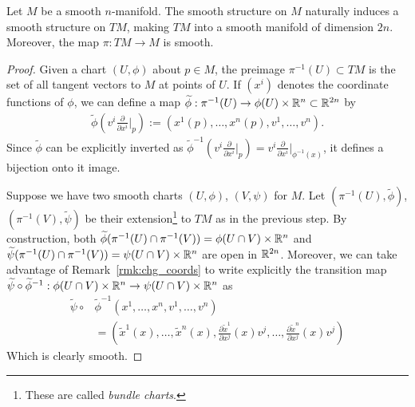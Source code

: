 \begin{theorem}\label{thm:tgbdlsmoothmfld}
  Let $M$ be a smooth $n$-manifold.
  The smooth structure on $M$ naturally induces a smooth structure on $TM$, making $TM$ into a smooth manifold of dimension $2n$.
  Moreover, the map $\pi: TM \to M$ is smooth.
\end{theorem}
\begin{proof}
  Given a chart $(U,\phi)$ about $p\in M$, the preimage $\pi^{-1}(U) \subset TM$ is the set of all tangent vectors to $M$ at points of $U$.
  If $(x^i)$ denotes the coordinate functions of $\phi$, we can define a map $\widetilde\phi : \pi^{-1}(U) \to \phi(U)\times\mathbb{R}^n \subset \mathbb{R}^{2n}$ by
  \begin{align}\label{eq:nat_coords}
    \widetilde\phi\left(v^i \frac{\partial}{\partial x^i}\Big|_p\right) := \left(x^1(p), \ldots, x^n(p), v^1, \ldots, v^n\right).
  \end{align}
  Since $\widetilde\phi$ can be explicitly inverted as $\widetilde\phi^{-1}\left(v^i \frac{\partial}{\partial x^i}\Big|_p\right) = v^i \frac{\partial}{\partial x^i}\Big|_{\phi^{-1}(x)}$, it defines a bijection onto it image.

  Suppose we have two smooth charts $(U,\phi)$, $(V,\psi)$ for $M$.
  Let $(\pi^{-1}(U),\widetilde\phi)$, $(\pi^{-1}(V),\widetilde\psi)$ be their extension\footnote{These are called \emph{bundle charts}.} to $TM$ as in the previous step.
  By construction, both $\widetilde\phi(\pi^{-1}(U)\cap\pi^{-1}(V)) = \phi(U\cap V)\times\mathbb{R}^n$ and $\widetilde\psi(\pi^{-1}(U)\cap\pi^{-1}(V)) = \psi(U\cap V)\times\mathbb{R}^n$ are open in $\mathbb{R}^{2n}$.
  Moreover, we can take advantage of Remark~\ref{rmk:chg_coords} to write explicitly the transition map  $\widetilde\psi\circ\widetilde\phi^{-1}: \phi(U\cap V)\times\mathbb{R}^n \to \psi(U\cap V)\times\mathbb{R}^n$ as
  \begin{align}
    \widetilde\psi\circ&\widetilde\phi^{-1}\left(x^1, \ldots, x^n, v^1, \ldots, v^n\right) \\
    &=\left(\widetilde x^1(x),\ldots, \widetilde x^n(x), \frac{\partial \widetilde x^1}{\partial x^j}(x) v^j, \ldots, \frac{\partial \widetilde x^n}{\partial x^j}(x) v^j\right)
  \end{align}
  Which is clearly smooth.


\end{proof}
